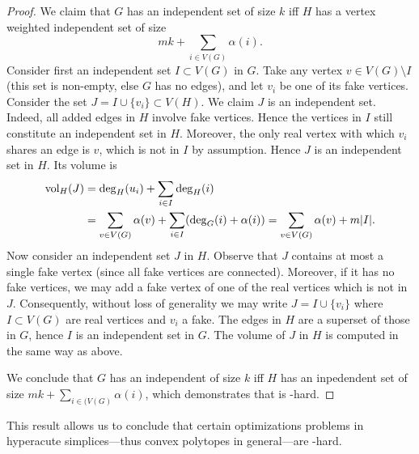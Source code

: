 \begin{proof}
	We  claim that $G$ has an independent  set of size $k$ iff $H$ has a vertex weighted independent set of size 
	\[mk + \sum_{i\in V(G)} \alpha(i) .\]
	Consider first an independent  set $I\subset V(G)$ in $G$. Take any vertex  $v\in  V(G)\setminus I$ (this set  is non-empty, else $G$ has  no edges), and let $v_i$ be one of its fake vertices. Consider the set $J=I\cup\{v_i\}\subset  V(H)$.  We claim $J$  is an  independent set. Indeed, all added edges in $H$ involve  fake  vertices.  Hence the vertices  in  $I$  still constitute an independent  set in $H$. Moreover, the  only real vertex with  which $v_i$ shares  an edge  is $v$,  which is not in $I$ by assumption. Hence  $J$ is  an independent  set in $H$. Its volume is
	\begin{align*}
	\textnormal{vol}_H(J)  &= \deg_H(u_i)+\sum_{i\in I}\deg_H(i) \\
	&=  \sum_{v\in V(G)} \alpha(v) + \sum_{i\in  I}(\deg_G(i) + \alpha(i)) = \sum_{v\in V(G)}\alpha(v) + m|I|.
	\end{align*}
	Now  consider an independent set $J$ in $H$. Observe that $J$ contains  at most  a single fake vertex (since all  fake vertices are connected). Moreover, if it  has no fake vertices,  we may add a fake vertex of one of the real   vertices which  is not in  $J$. Consequently, without  loss of  generality we may write $J=I\cup\{v_i\}$ where $I\subset V(G)$ are real vertices  and $v_i$ a fake. The edges in $H$ are  a  superset of those in $G$,  hence  $I$ is an independent  set in $G$. The volume of $J$ in  $H$ is computed in the same  way as above. 
	
	We conclude that $G$ has an independent of  size  $k$ iff  $H$ has an  inpedendent  set of  size $mk+\sum_{i\in (V(G)}\alpha(i)$,  which demonstrates that \mwis is \NP-hard. 
\end{proof}


This result allows us to conclude that certain optimizations problems in hyperacute simplices---thus convex polytopes in general---are \NP-hard. 

